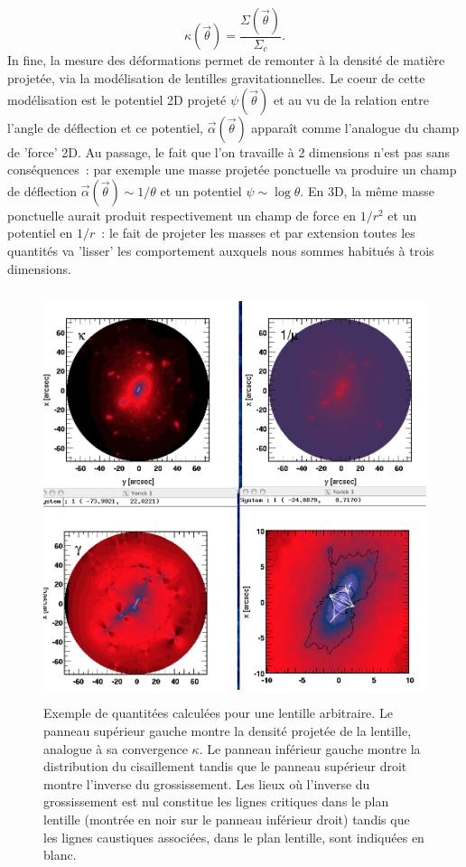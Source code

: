 \begin{equation}
\kappa (\vec{\theta}) =\frac{\Sigma(\vec{\theta})}{\Sigma_c}.
\end{equation}
In fine, la mesure des déformations permet de remonter à la densité de matière projetée, via la modélisation de lentilles gravitationnelles. Le coeur de cette modélisation est le potentiel 2D projeté $\psi(\vec{\theta})$ et au vu de la relation entre l'angle de déflection et ce potentiel, $\vec{\alpha}(\vec{\theta})$ apparaît comme l'analogue du champ de 'force' 2D. Au passage, le fait que l'on travaille à 2 dimensions n'est pas sans conséquences~: par exemple une masse projetée ponctuelle va produire un champ de déflection $\vec{\alpha}(\vec{\theta})\sim 1/\theta$ et un potentiel $\psi \sim \log \theta$. En 3D, la même masse ponctuelle aurait produit respectivement un champ de force en $1/r^2$ et un potentiel en $1/r$~: le fait de projeter les masses et par extension toutes les quantités va 'lisser' les comportement auxquels nous sommes habitués à trois dimensions.
\begin{figure}[htbp]
	\centering
		\includegraphics[height=12cm]{figs/SPLHALO.png}
	\caption[Les quantités pertinentes d'une lentille gravitationnelle]{Exemple de quantitées calculées pour une lentille arbitraire. Le panneau supérieur gauche montre la densité projetée de la lentille, analogue à sa convergence $\kappa$. Le panneau inférieur gauche montre la distribution du cisaillement tandis que le panneau supérieur droit montre l'inverse du grossissement. Les lieux où l'inverse du grossissement est nul constitue les lignes critiques dans le plan lentille (montrée en noir sur le panneau inférieur droit) tandis que les lignes caustiques associées, dans le plan lentille, sont indiquées en blanc.} 
	\label{f:SPLHALO}
\end{figure}

